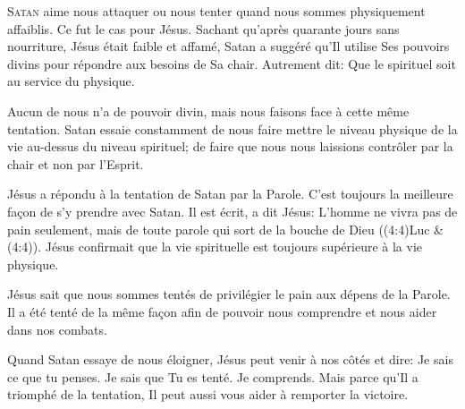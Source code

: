 


\lettrine{S}{atan} aime nous attaquer ou nous tenter
 quand nous sommes physiquement affaiblis.
 Ce fut le cas pour Jésus. Sachant qu'après quarante jours sans nourriture,
 Jésus était faible et affamé, Satan a suggéré qu'Il utilise
 Ses pouvoirs divins pour répondre aux besoins de Sa chair.
 Autrement dit: 
 \Og Que le spirituel soit au service du physique. \Fg{}

Aucun de nous n'a de pouvoir divin, mais nous faisons face
 à cette même tentation. Satan essaie constamment de nous faire mettre
 le niveau physique de la vie au-dessus du niveau spirituel;
 de faire que nous nous laissions contrôler 
 par la chair et non par l'Esprit.

Jésus a répondu à la tentation de Satan par la Parole.
 C'est toujours la meilleure fa\c{c}on de s'y prendre avec Satan.
 \Og Il est écrit, a dit Jésus: L'homme ne vivra pas de pain seulement,
 mais de toute parole qui sort de la bouche de Dieu \Fg{}
 ((4:4)Luc \& (4:4)).
 Jésus confirmait que la vie spirituelle est toujours supérieure
 à la vie physique.


Jésus sait que nous sommes tentés de privilégier le pain aux dépens
 de la Parole. Il a été tenté de la même fa\c{c}on afin de pouvoir 
 nous comprendre et nous aider dans nos combats.

Quand Satan essaye de nous éloigner, Jésus peut venir à nos côtés
 et dire: 
 \Og Je sais ce que tu penses. Je sais que Tu es tenté. Je comprends. \Fg{}
 Mais parce qu'Il a triomphé de la tentation, Il peut aussi vous aider
 à remporter la victoire.

\dvrule


